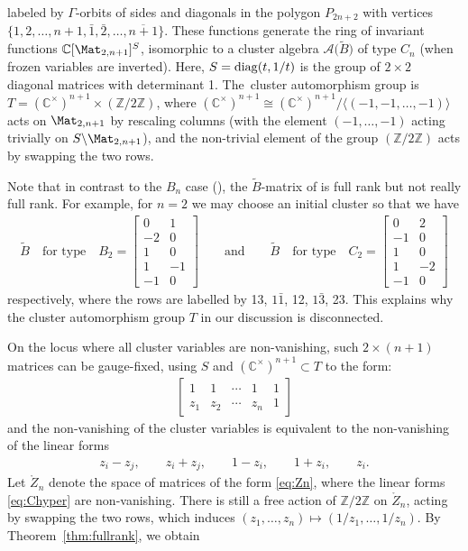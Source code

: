 \documentclass[pdftex]{sigma}%
\def\C{{\mathbb C}}
\def\Z{{\mathbb Z}}
\def\A{{\mathcal{A}}}
\def\Zo{{\mathring{Z}}}
\def\tB{{\tilde B}}
\def\tB{{\tilde B}}
\numberwithin{equation}{section}
\begin{document}
\noindent
labeled by $\Gamma$-orbits of sides and diagonals in the polygon $P_{2n+2}$ with vertices $\{1,2,\dots,n+1,\bar 1, \bar 2, \dots, \overline{n+1}\}$. These functions generate the ring of invariant functions $\C[\Mat_{2,n+1}]^{S}$, isomorphic to a cluster algebra $\A\big(\tB\big)$ of type $C_n$ (when frozen variables are inverted). Here, $S = {\rm diag}(t,1/t)$ is the group of $2 \times 2$ diagonal matrices with determinant 1. The~cluster automorphism group is $T = (\C^\times)^{n+1} \times (\Z/2\Z)$, where $(\C^\times)^{n+1} \cong (\C^\times)^{n+1}/\langle (-1,-1,\dots,-1) \rangle$ acts on
$\Mat_{2,n+1}$ by rescaling columns (with the element $(-1,\dots,-1)$ acting trivially on $S \backslash \Mat_{2,n+1}$), and the non-trivial element of the group $(\Z/2\Z)$ acts by swapping the two rows.
\begin{Remark}
Note that in contrast to the $B_n$ case (\cite[Example 12.10]{CA2}), the $\tB$-matrix of \cite[Example 12.12]{CA2} is full rank but not really full rank. For example, for $n = 2$ we may choose an initial cluster so that we have
\begin{gather*}
\tB\quad \text{for type}\quad B_2= \begin{bmatrix} 0 & 1 \\
-2 & 0 \\
1 & 0 \\
1&-1\\
-1 & 0 \end{bmatrix} \qquad \text{and} \qquad
\tB\quad \text{for type}\quad C_2 = \begin{bmatrix} 0 & 2 \\
-1 & 0 \\
1 & 0 \\
1&-2\\
-1 & 0 \end{bmatrix}
\end{gather*}
respectively, where the rows are labelled by 13, $1\bar 1$, 12, $1 \bar 3$, 23. This explains why the cluster automorphism group $T$ in our discussion is disconnected.
\end{Remark}
On the locus where all cluster variables are non-vanishing, such $2 \times (n+1)$ matrices can be gauge-fixed, using $S$ and $(\C^\times)^{n+1} \subset T$ to the form:
\begin{gather}\label{eq:Zn}
\begin{bmatrix}
1 & 1 & \cdots & 1 &1 \\
z_1 & z_2 & \cdots & z_n & 1
\end{bmatrix}
\end{gather}
and the non-vanishing of the cluster variables is equivalent to the non-vanishing of the linear forms
\begin{gather}\label{eq:Chyper}
z_i - z_j, \qquad z_i + z_j, \qquad 1-z_i, \qquad 1+ z_i, \qquad z_i.
\end{gather}
Let $\Zo_n$ denote the space of matrices of the form \eqref{eq:Zn}, where the linear forms \eqref{eq:Chyper} are non-vanishing. There is still a free action of $\Z/2\Z$ on $\Zo_n$, acting by swapping the two rows, which induces $(z_1,\dots,z_n) \mapsto (1/z_1,\dots,1/z_n)$. By Theorem~\ref{thm:fullrank}, we obtain
\end{document}
